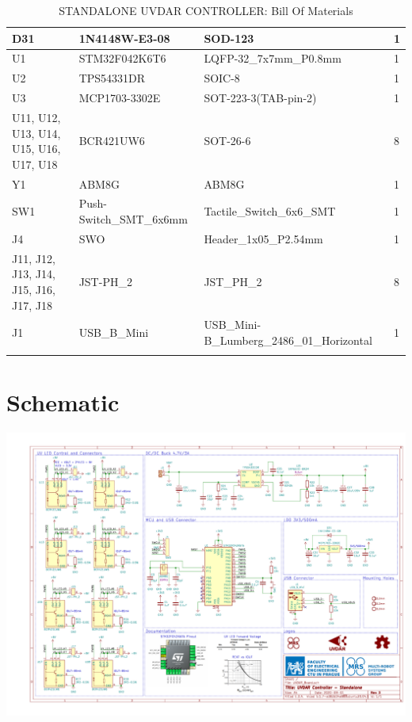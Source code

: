 \documentclass[12pt, a4paper]{article}
\begin{document}
\begin{longtable}{|p{5cm}|p{5cm}|p{5cm}|p{1.7cm}|}
D31                                    & 1N4148W-E3-08           & SOD-123                                    & 1        \\ \hline
U1                                     & STM32F042K6T6           & LQFP-32\_7x7mm\_P0.8mm                     & 1        \\ \hline
U2                                     & TPS54331DR              & SOIC-8                                     & 1        \\ \hline
U3                                     & MCP1703-3302E           & SOT-223-3(TAB-pin-2)                       & 1        \\ \hline
U11, U12, U13, U14, U15, U16, U17, U18 & BCR421UW6               & SOT-26-6                                   & 8        \\ \hline
Y1                                     & ABM8G                   & ABM8G                                      & 1        \\ \hline
SW1                                    & Push-Switch\_SMT\_6x6mm & Tactile\_Switch\_6x6\_SMT                  & 1        \\ \hline
J4                                     & SWO                     & Header\_1x05\_P2.54mm                      & 1        \\ \hline
J11, J12, J13, J14, J15, J16, J17, J18 & JST-PH\_2               & JST\_PH\_2                                 & 8        \\ \hline
J1                                     & USB\_B\_Mini            & USB\_Mini-B\_Lumberg\_2486\_01\_Horizontal & 1        \\ \hline

\caption{STANDALONE UVDAR CONTROLLER: Bill Of Materials}
\label{tab:bom}
\end{longtable}
\vfill
\restoregeometry

\pagebreak


\pagebreak
\section{Schematic}
\includegraphics[scale=0.8, angle=270]{figures/Schematic.pdf}
\end{document}
